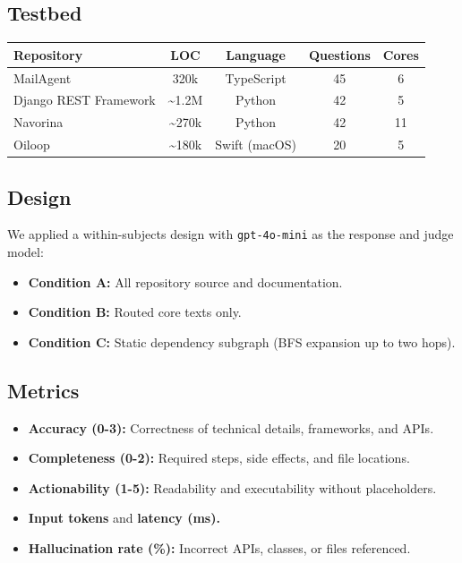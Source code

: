 \documentclass[11pt]{article}
\newcounter{none}
\providecommand{\tightlist}{%
  \setlength{\itemsep}{2pt}%
  \setlength{\parskip}{0pt}%
}
\begin{document}
\subsection{Testbed}\label{testbed}

{\def\LTcaptype{none} %
\begin{longtable}[]{@{}lcccc@{}}
\toprule\noalign{}
Repository & LOC & Language & Questions & Cores \\
\midrule\noalign{}
\endhead
\bottomrule\noalign{}
\endlastfoot
MailAgent & 320k & TypeScript & 45 & 6 \\
Django REST Framework & \textasciitilde1.2M & Python & 42 & 5 \\
Navorina & \textasciitilde270k & Python & 42 & 11 \\
Oiloop & \textasciitilde180k & Swift (macOS) & 20 & 5 \\
\end{longtable}
}

\subsection{Design}\label{design}

We applied a within-subjects design with \texttt{gpt-4o-mini} as the
response and judge model:

\begin{itemize}
\tightlist
\item
  \textbf{Condition A:} All repository source and documentation.
\item
  \textbf{Condition B:} Routed core texts only.
\item
  \textbf{Condition C:} Static dependency subgraph (BFS expansion up to
  two hops).
\end{itemize}

\subsection{Metrics}\label{metrics}

\begin{itemize}
\tightlist
\item
  \textbf{Accuracy (0-3):} Correctness of technical details, frameworks,
  and APIs.
\item
  \textbf{Completeness (0-2):} Required steps, side effects, and file
  locations.
\item
  \textbf{Actionability (1-5):} Readability and executability without
  placeholders.
\item
  \textbf{Input tokens} and \textbf{latency (ms).}
\item
  \textbf{Hallucination rate (\%):} Incorrect APIs, classes, or files
  referenced.
\end{itemize}
\end{document}
